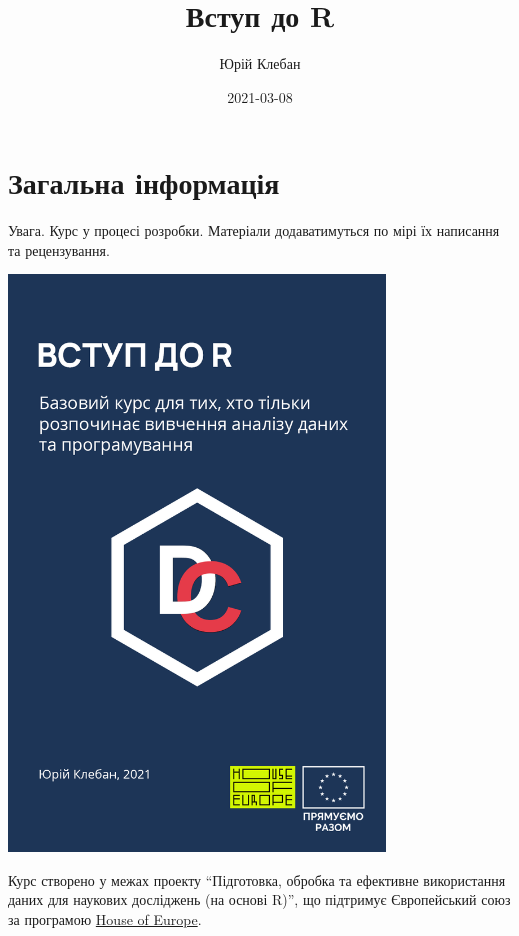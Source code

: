 \documentclass[
]{book}
\title{Вступ до R}
\author{Юрій Клебан}
\date{2021-03-08}
\begin{document}
\maketitle

{
\setcounter{tocdepth}{1}
\tableofcontents
}
\hypertarget{ux437ux430ux433ux430ux43bux44cux43dux430-ux456ux43dux444ux43eux440ux43cux430ux446ux456ux44f}{%
\chapter*{Загальна інформація}\label{ux437ux430ux433ux430ux43bux44cux43dux430-ux456ux43dux444ux43eux440ux43cux430ux446ux456ux44f}}

Увага. Курс у процесі розробки. Матеріали додаватимуться по мірі їх написання та рецензування.

\includegraphics[width=0.75\textwidth,height=\textheight]{images/cover.png}

Курс створено у межах проекту ``Підготовка, обробка та ефективне використання даних для наукових досліджень (на основі R)'', що підтримує Європейський союз за програмою \href{https://houseofeurope.org.ua/}{House of Europe}.
\end{document}
